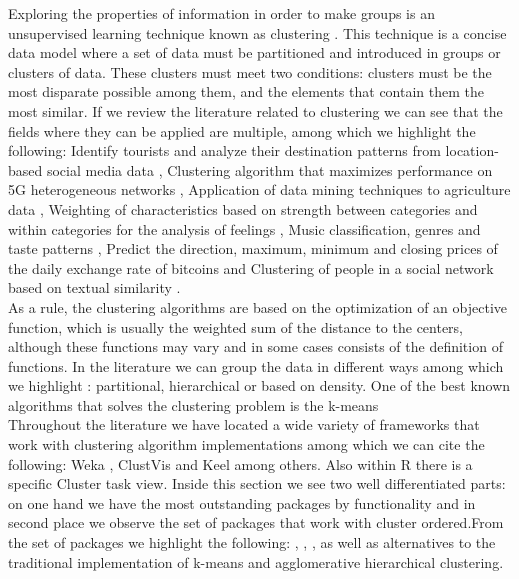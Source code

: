 Exploring the properties of information in order to make groups is an unsupervised learning technique known as clustering \citep{b46} \citep{b47}. This technique is a concise data model where a set of data must be partitioned and introduced in groups or clusters of data. These clusters must meet two conditions: clusters must be the most disparate possible among them, and the elements that contain them the most similar. If we review the literature related to clustering we can see that the fields where they can be applied are multiple, among which we highlight the following: Identify tourists and analyze their destination patterns from location-based social media data \citep{b1}, Clustering algorithm that maximizes performance on 5G heterogeneous networks \citep{b2}, Application of data mining techniques to agriculture data \citep{b3}, Weighting of characteristics based on strength between categories and within categories for the analysis of feelings \citep{b4}, Music classification, genres and taste patterns \citep{b5}, Predict the direction, maximum, minimum and closing prices of the daily exchange rate of bitcoins \citep{b6} and Clustering of people in a social network based on textual similarity \citep{b7}.\\
As a rule, the clustering algorithms are based on the optimization of an objective function, which is usually the weighted sum of the distance to the centers, although these functions may vary and in some cases consists of the definition of functions. In the literature we can group the data in different ways among which we highlight \citep{b48}: partitional, hierarchical or based on density. One of the best known algorithms that solves the clustering problem is the k-means \citep{b49}\\
Throughout the literature we have located a wide variety of frameworks that work with clustering algorithm implementations among which we can cite the following: Weka \citep{b13}, ClustVis \citep{b14} and Keel \citep{b15} among others. Also within R there is a specific Cluster task view. Inside this section we see two well differentiated parts: on one hand we have the most outstanding packages by functionality and in second place we observe the set of packages that work with cluster ordered.From the set of packages we highlight the following:  \citep{b9},  \citep{b10},  \citep{b11},  \citep{b12} as well as alternatives to the traditional implementation of k-means and agglomerative hierarchical clustering.\\
